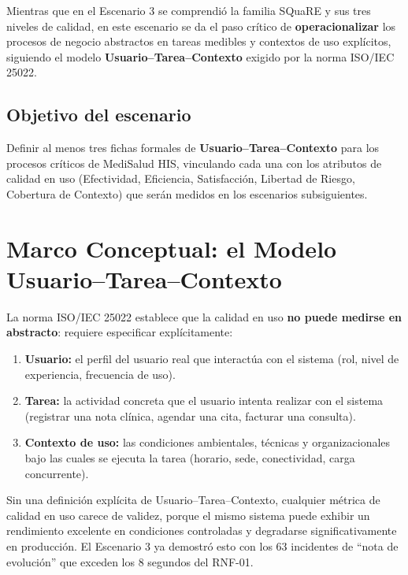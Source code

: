 \documentclass[12pt,a4paper]{article}
\begin{document}
Mientras que en el Escenario 3 se comprendi\'o la familia SQuaRE y sus tres niveles de calidad, en este escenario se da el paso cr\'itico de \textbf{operacionalizar} los procesos de negocio abstractos en tareas medibles y contextos de uso expl\'icitos, siguiendo el modelo \textbf{Usuario--Tarea--Contexto} exigido por la norma ISO/IEC 25022.

\subsection{Objetivo del escenario}
Definir al menos tres fichas formales de \textbf{Usuario--Tarea--Contexto} para los procesos cr\'iticos de MediSalud HIS, vinculando cada una con los atributos de calidad en uso (Efectividad, Eficiencia, Satisfacci\'on, Libertad de Riesgo, Cobertura de Contexto) que ser\'an medidos en los escenarios subsiguientes.

\section{Marco Conceptual: el Modelo Usuario--Tarea--Contexto}

La norma ISO/IEC 25022 establece que la calidad en uso \textbf{no puede medirse en abstracto}: requiere especificar expl\'icitamente:
\begin{enumerate}
    \item \textbf{Usuario:} el perfil del usuario real que interact\'ua con el sistema (rol, nivel de experiencia, frecuencia de uso).
    \item \textbf{Tarea:} la actividad concreta que el usuario intenta realizar con el sistema (registrar una nota cl\'inica, agendar una cita, facturar una consulta).
    \item \textbf{Contexto de uso:} las condiciones ambientales, t\'ecnicas y organizacionales bajo las cuales se ejecuta la tarea (horario, sede, conectividad, carga concurrente).
\end{enumerate}

\begin{tcolorbox}[colback=blue!5, colframe=blue!50!black, title=Idea central]
Sin una definici\'on expl\'icita de Usuario--Tarea--Contexto, cualquier m\'etrica de calidad en uso carece de validez, porque el mismo sistema puede exhibir un rendimiento excelente en condiciones controladas y degradarse significativamente en producci\'on. El Escenario 3 ya demostr\'o esto con los 63 incidentes de ``nota de evoluci\'on'' que exceden los 8 segundos del RNF-01.
\end{tcolorbox}
\end{document}
